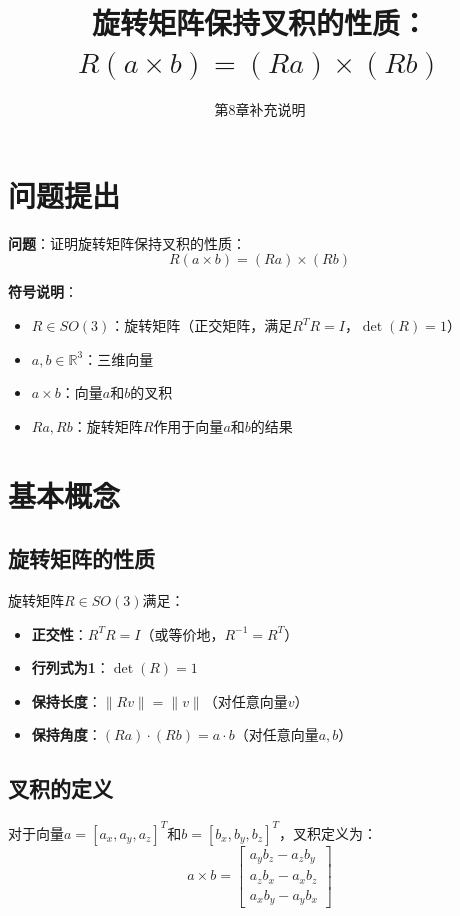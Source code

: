 \documentclass[12pt,a4paper]{article}
\title{旋转矩阵保持叉积的性质：$R(a \times b) = (Ra) \times (Rb)$}
\author{第8章补充说明}
\date{}
\begin{document}
\maketitle

\section{问题提出}

\textbf{问题}：证明旋转矩阵保持叉积的性质：
\begin{equation}
R(a \times b) = (Ra) \times (Rb) \tag{5}
\end{equation}

\textbf{符号说明}：
\begin{itemize}
\item $R \in SO(3)$：旋转矩阵（正交矩阵，满足$R^T R = I$，$\det(R) = 1$）
\item $a, b \in \mathbb{R}^3$：三维向量
\item $a \times b$：向量$a$和$b$的叉积
\item $Ra, Rb$：旋转矩阵$R$作用于向量$a$和$b$的结果
\end{itemize}

\section{基本概念}

\subsection{旋转矩阵的性质}

旋转矩阵$R \in SO(3)$满足：
\begin{itemize}
\item \textbf{正交性}：$R^T R = I$（或等价地，$R^{-1} = R^T$）
\item \textbf{行列式为1}：$\det(R) = 1$
\item \textbf{保持长度}：$\|R v\| = \|v\|$（对任意向量$v$）
\item \textbf{保持角度}：$(Ra) \cdot (Rb) = a \cdot b$（对任意向量$a, b$）
\end{itemize}

\subsection{叉积的定义}

对于向量$a = [a_x, a_y, a_z]^T$和$b = [b_x, b_y, b_z]^T$，叉积定义为：
\begin{equation}
a \times b = \begin{bmatrix}
a_y b_z - a_z b_y \\
a_z b_x - a_x b_z \\
a_x b_y - a_y b_x
\end{bmatrix}
\end{equation}
\end{document}
